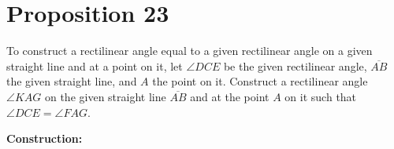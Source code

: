 
\renewcommand\qedsymbol{Q.E.F}

\section*{Proposition 23}

\begin{con}
To construct a rectilinear angle equal to a given rectilinear angle on a given straight line and at a point on it, let $\angle{DCE}$ be the given rectilinear angle, $\overline{AB}$ the given straight line, and $A$ the point on it. Construct a rectilinear angle $\angle{KAG}$ on the given straight line $\overline{AB}$ and at the point $A$ on it such that $\angle{DCE} = \angle{FAG}$.
\end{con}

\textbf{Construction:}

\begin{figure}[H]
	\begin{subfigure}{0.45\textwidth}
		\caption{}
	\end{subfigure}
	\begin{subfigure}{0.45\textwidth}
		\caption{}
	\end{subfigure}
	\caption{}
\end{figure}

